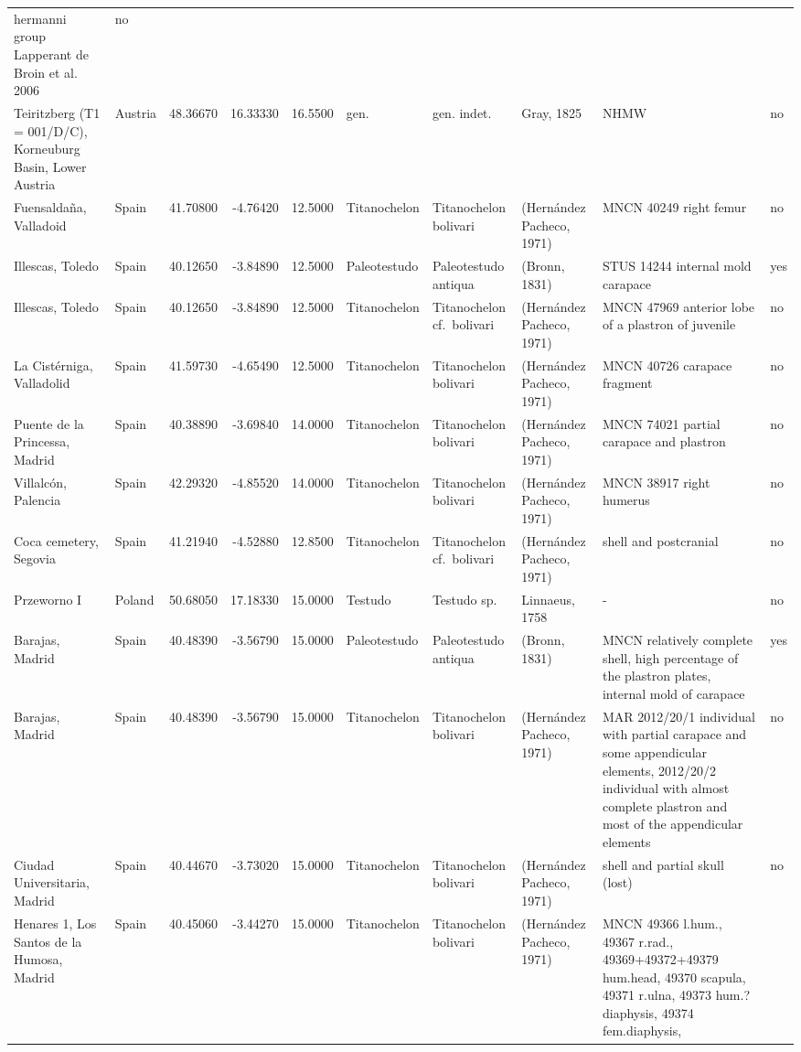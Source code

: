 \documentclass[]{article}
\begin{document}
\begin{longtable}[]{@{}llrrrlllll@{}}
hermanni group Lapperant de Broin et al. 2006 & no\tabularnewline
Teiritzberg (T1 = 001/D/C), Korneuburg Basin, Lower Austria & Austria &
48.36670 & 16.33330 & 16.5500 & gen. & gen. indet. & Gray, 1825 & NHMW &
no\tabularnewline
Fuensaldaña, Valladoid & Spain & 41.70800 & -4.76420 & 12.5000 &
Titanochelon & Titanochelon bolivari & (Hernández Pacheco, 1971) & MNCN
40249 right femur & no\tabularnewline
Illescas, Toledo & Spain & 40.12650 & -3.84890 & 12.5000 & Paleotestudo
& Paleotestudo antiqua & (Bronn, 1831) & STUS 14244 internal mold
carapace & yes\tabularnewline
Illescas, Toledo & Spain & 40.12650 & -3.84890 & 12.5000 & Titanochelon
& Titanochelon cf.~bolivari & (Hernández Pacheco, 1971) & MNCN 47969
anterior lobe of a plastron of juvenile & no\tabularnewline
La Cistérniga, Valladolid & Spain & 41.59730 & -4.65490 & 12.5000 &
Titanochelon & Titanochelon bolivari & (Hernández Pacheco, 1971) & MNCN
40726 carapace fragment & no\tabularnewline
Puente de la Princessa, Madrid & Spain & 40.38890 & -3.69840 & 14.0000 &
Titanochelon & Titanochelon bolivari & (Hernández Pacheco, 1971) & MNCN
74021 partial carapace and plastron & no\tabularnewline
Villalcón, Palencia & Spain & 42.29320 & -4.85520 & 14.0000 &
Titanochelon & Titanochelon bolivari & (Hernández Pacheco, 1971) & MNCN
38917 right humerus & no\tabularnewline
Coca cemetery, Segovia & Spain & 41.21940 & -4.52880 & 12.8500 &
Titanochelon & Titanochelon cf.~bolivari & (Hernández Pacheco, 1971) &
shell and postcranial & no\tabularnewline
Przeworno I & Poland & 50.68050 & 17.18330 & 15.0000 & Testudo & Testudo
sp. & Linnaeus, 1758 & - & no\tabularnewline
Barajas, Madrid & Spain & 40.48390 & -3.56790 & 15.0000 & Paleotestudo &
Paleotestudo antiqua & (Bronn, 1831) & MNCN relatively complete shell,
high percentage of the plastron plates, internal mold of carapace &
yes\tabularnewline
Barajas, Madrid & Spain & 40.48390 & -3.56790 & 15.0000 & Titanochelon &
Titanochelon bolivari & (Hernández Pacheco, 1971) & MAR 2012/20/1
individual with partial carapace and some appendicular elements,
2012/20/2 individual with almost complete plastron and most of the
appendicular elements & no\tabularnewline
Ciudad Universitaria, Madrid & Spain & 40.44670 & -3.73020 & 15.0000 &
Titanochelon & Titanochelon bolivari & (Hernández Pacheco, 1971) & shell
and partial skull (lost) & no\tabularnewline
Henares 1, Los Santos de la Humosa, Madrid & Spain & 40.45060 & -3.44270
& 15.0000 & Titanochelon & Titanochelon bolivari & (Hernández Pacheco,
1971) & MNCN 49366 l.hum., 49367 r.rad., 49369+49372+49379 hum.head,
49370 scapula, 49371 r.ulna, 49373 hum.? diaphysis, 49374 fem.diaphysis,

\end{longtable}
\end{document}
